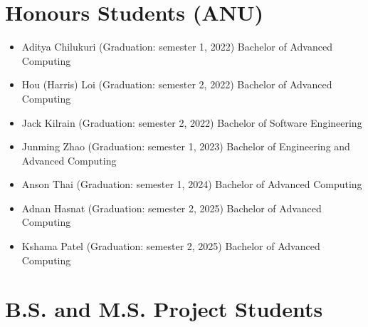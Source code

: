 \documentclass[singlecolumn,singlespace,11pt]{article}
\begin{document}
\section*{Honours Students (ANU)}

\begin{itemize}

\item Aditya Chilukuri (Graduation: semester 1, 2022) Bachelor of Advanced Computing 
\item Hou (Harris) Loi (Graduation: semester 2, 2022) Bachelor of Advanced Computing 
\item Jack Kilrain (Graduation: semester 2, 2022) Bachelor of Software Engineering 
\item Junming Zhao (Graduation: semester 1, 2023) Bachelor of Engineering and Advanced Computing 
\item Anson Thai (Graduation: semester 1, 2024) Bachelor of Advanced Computing
\item Adnan Hasnat (Graduation: semester 2, 2025) Bachelor of Advanced Computing
\item Kshama Patel (Graduation: semester 2, 2025) Bachelor of Advanced Computing

\end{itemize}

\section*{B.S. and M.S. Project Students}
\end{document}

